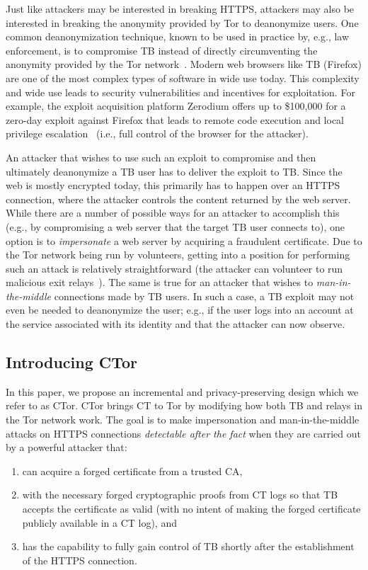 Just like attackers may be interested in breaking HTTPS, attackers may also be
interested in breaking the anonymity provided by Tor to deanonymize users. One
common deanonymization technique, known to be used in practice by, e.g., law
enforcement, is to compromise TB instead of directly circumventing the anonymity
provided by the Tor network~\cite{zerotor}. Modern web browsers like TB
(Firefox) are one of the most complex types of software in wide use today. This
complexity and wide use leads to security vulnerabilities and incentives for
exploitation. For example, the exploit acquisition platform Zerodium offers up
to \$100,000 for a zero-day exploit against Firefox that leads to remote code
execution and local privilege escalation~\cite{zeromain} (i.e., full control of
the browser for the attacker).

An attacker that wishes to use such an exploit to compromise and then ultimately
deanonymize a TB user has to deliver the exploit to TB\@. Since the web is
mostly encrypted today, this primarily has to happen over an HTTPS connection,
where the attacker controls the content returned by the web server. While there
are a number of possible ways for an attacker to accomplish this (e.g., by
compromising a web server that the target TB user connects to), one option is to
\emph{impersonate} a web server by acquiring a fraudulent certificate. Due to
the Tor network being run by volunteers, getting into a position for performing
such an attack is relatively straightforward (the attacker can volunteer to run
malicious exit relays~\cite{spoiled-onions}). The same is true for an attacker that
wishes to \emph{man-in-the-middle} connections made by TB users. In such a case,
a TB exploit may not even be needed to deanonymize the user; e.g., if the user
logs into an account at the service associated with its identity and that the
attacker can now observe.

\subsection{Introducing CTor}
In this paper, we propose an incremental and privacy-preserving design which we
refer to as CTor. CTor brings CT to Tor by modifying how both TB and relays in
the Tor network work. The goal is to make impersonation and man-in-the-middle
attacks on HTTPS connections \emph{detectable after the fact} when they are
carried out by a powerful attacker that:
\begin{enumerate}
	\item can acquire a forged certificate from a trusted CA,
	\item with the necessary forged cryptographic proofs from CT logs so that TB
	accepts the certificate as valid (with no intent of making the forged
	certificate publicly available in a CT log), and
	\item has the capability to fully gain control of TB shortly after the
	establishment of the HTTPS connection.
\end{enumerate}

